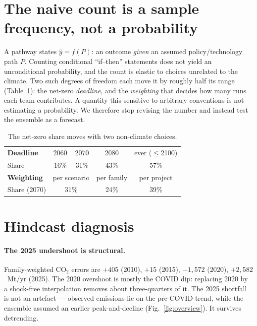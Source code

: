 \documentclass[sigconf, nonacm]{acmart}
\begin{document}
\section{The naive count is a sample frequency, not a probability}
\label{sec:count}
A pathway states $\hat{y}=f(P)$: an outcome \emph{given} an assumed policy/technology path $P$. Counting conditional ``if--then'' statements does not yield an unconditional probability, and the count is elastic to choices unrelated to the climate. Two such degrees of freedom each move it by roughly half its range (Table~\ref{tab:sens}): the net-zero \emph{deadline}, and the \emph{weighting} that decides how many runs each team contributes. A quantity this sensitive to arbitrary conventions is not estimating a probability. We therefore stop revising the number and instead test the ensemble as a forecast.

\begin{table}[h]
\centering\small
\caption{The net-zero share moves with two non-climate choices.}
\label{tab:sens}
\begin{tabular}{lcccc}
\toprule
\textbf{Deadline} & 2060 & 2070 & 2080 & ever ($\leq$2100) \\
Share & 16\% & 31\% & 43\% & 57\% \\
\midrule
\textbf{Weighting} & \multicolumn{2}{c}{per scenario} & per family & per project \\
Share (2070) & \multicolumn{2}{c}{31\%} & 24\% & 39\% \\
\bottomrule
\end{tabular}
\end{table}

\section{Hindcast diagnosis}
\label{sec:hindcast}
\paragraph{The 2025 undershoot is structural.}
Family-weighted CO$_2$ errors are $+405$ (2010), $+15$ (2015), $-1{,}572$ (2020), $+2{,}582$~Mt/yr (2025). The 2020 overshoot is mostly the COVID dip: replacing 2020 by a shock-free interpolation removes about three-quarters of it. The 2025 shortfall is not an artefact --- observed emissions lie on the pre-COVID trend, while the ensemble assumed an earlier peak-and-decline (Fig.~\ref{fig:overview}). It survives detrending.
\end{document}

